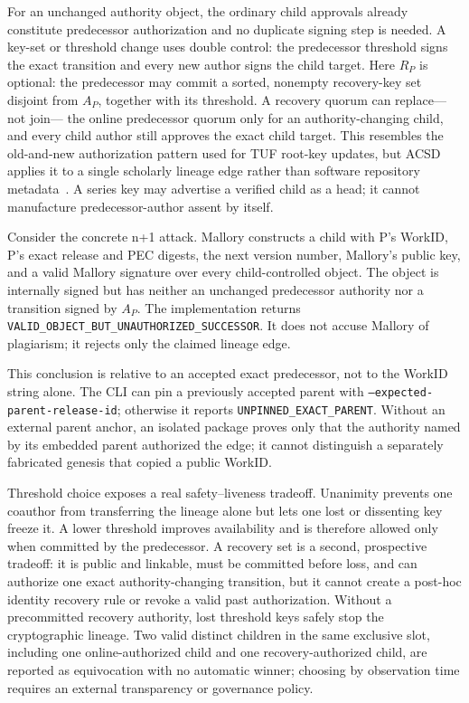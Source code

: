 \documentclass[conference,compsoc]{IEEEtran}
\begin{document}
For an unchanged authority object, the ordinary child approvals already constitute
predecessor authorization and no duplicate signing step is needed. A key-set or
threshold change uses double control: the predecessor threshold signs the exact
transition and every new author signs the child target. Here $R_P$ is optional:
the predecessor may commit a sorted, nonempty recovery-key set disjoint from
$A_P$, together with its threshold. A recovery quorum can replace---not join---
the online predecessor quorum only for an authority-changing child, and every
child author still approves the exact child target. This resembles the
old-and-new authorization pattern used for TUF root-key updates, but ACSD
applies it to a single scholarly lineage edge rather than software repository
metadata~\cite{tufspec}. A series key may advertise a verified child as a head;
it cannot manufacture predecessor-author assent by itself.

Consider the concrete n+1 attack. Mallory constructs a child with P's WorkID,
P's exact release and PEC digests, the next version number, Mallory's public
key, and a valid Mallory signature over every child-controlled object. The
object is internally signed but has neither an unchanged predecessor authority
nor a transition signed by $A_P$. The implementation returns
\texttt{VALID\_OBJECT\_BUT\_UNAUTHORIZED\_SUCCESSOR}. It does not accuse
Mallory of plagiarism; it rejects only the claimed lineage edge.

This conclusion is relative to an accepted exact predecessor, not to the
WorkID string alone. The CLI can pin a previously accepted parent with
\texttt{--expected-parent-release-id}; otherwise it reports
\texttt{UNPINNED\_EXACT\_PARENT}. Without an external parent anchor, an isolated
package proves only that the authority named by its embedded parent authorized
the edge; it cannot distinguish a separately fabricated genesis that copied a
public WorkID.

Threshold choice exposes a real safety--liveness tradeoff. Unanimity prevents
one coauthor from transferring the lineage alone but lets one lost or dissenting
key freeze it. A lower threshold improves availability and is therefore allowed
only when committed by the predecessor. A recovery set is a second, prospective
tradeoff: it is public and linkable, must be committed before loss, and can
authorize one exact authority-changing transition, but it cannot create a
post-hoc identity recovery rule or revoke a valid past authorization. Without a
precommitted recovery authority, lost threshold keys safely stop the
cryptographic lineage. Two valid distinct children in the same exclusive slot,
including one online-authorized child and one recovery-authorized child, are
reported as equivocation with no automatic winner; choosing by observation time
requires an external transparency or governance policy.
\end{document}
